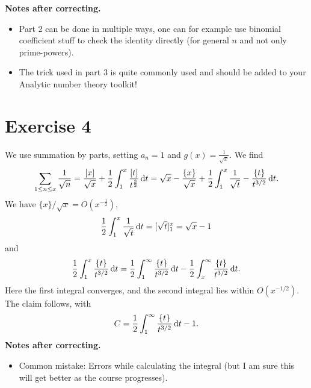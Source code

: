 \documentclass[a4paper,11pt]{article}
\begin{document}
\textbf{Notes after correcting.} \leavevmode
\begin{itemize}
    \item Part 2 can be done in multiple ways, one can for example use binomial coefficient stuff
        to check the identity directly (for general $n$ and not only prime-powers). 
    \item The trick used in part $3$ is quite commonly used and should be
        added to your Analytic number theory toolkit!  
\end{itemize}

\section*{Exercise 4}
We use summation by parts, setting $a_n = 1$ and $g(x) = \frac 1{\sqrt x}$. We find
\[
    \sum_{1 \leq n \leq x} \frac 1 {\sqrt n} = \frac{[x]}{\sqrt x} + \frac 12 \int_1^x
    \frac{[t]}{t^{\frac 32}} \mathrm{\,d} t = \sqrt x - \frac{\{x\}}{\sqrt x} + \frac 12 \int_1^x
    \frac 1{\sqrt t} - \frac{\{t\}}{t^{3/2}} \mathrm{\,d} t.
\]
We have $\{x\}/\sqrt x = O(x^{-\frac12})$,
\[
    \frac 12 \int_1^x \frac 1{\sqrt t} \mathrm{\,d} t= [\sqrt t]_1^x = \sqrt x - 1
\]
and 
\[
    \frac 12 \int_1^x \frac{\{t\}}{t^{3/2}} \mathrm{\,d} t = \frac 12 \int_1^\infty \frac{\{t\}}{t^{3/2}} \mathrm{\,d} t -  \frac 12 \int_x^\infty \frac{\{t\}}{t^{3/2}} \mathrm{\,d} t.
\]
Here the first integral converges, and the second integral lies within $O(x^{-1/2})$. The claim
follows, with 
\[
    C = \frac 12 \int_1^\infty \frac{\{t\}}{t^{3/2}} \mathrm{\,d} t  -1.
\]
\textbf{Notes after correcting.} \leavevmode
\begin{itemize}
    \item Common mistake: Errors while calculating the integral (but I am sure
        this will get better as the course progresses).
\end{itemize}
\end{document}
